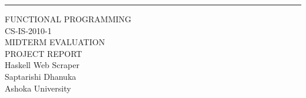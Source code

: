 \documentclass{scrreprt}
\date{}
\begin{document}
























\begin{flushright}
    \rule{16cm}{5pt}\vskip1cm
    \begin{bfseries}
        \Huge{FUNCTIONAL PROGRAMMING \\ CS-IS-2010-1 \\ MIDTERM EVALUATION \\ PROJECT REPORT}\\
        \vspace{1.9cm}
        Haskell Web Scraper\\
        \vspace{1.9cm}
        Saptarishi Dhanuka\\
        \vspace{1.9cm}
        Ashoka University\\
    \end{bfseries}
\end{flushright}
\end{document}
